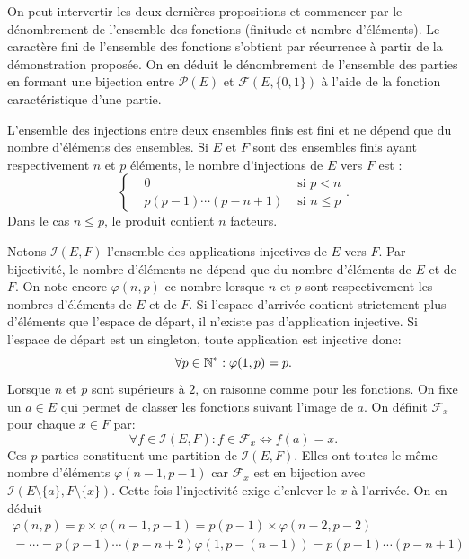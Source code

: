 \begin{rem}
 On peut intervertir les deux dernières propositions et commencer par le dénombrement de l'ensemble des fonctions (finitude et nombre d'éléments). Le caractère fini de l'ensemble des fonctions s'obtient par récurrence à partir de la démonstration proposée. On en déduit le dénombrement de l'ensemble des parties en formant une bijection entre $\mathcal P(E)$ et $\mathcal F(E,\{0,1\})$ à l'aide de la fonction caractéristique d'une partie. 
\end{rem}
\clearpage
{}
\begin{propn}
 L'ensemble des injections entre deux ensembles finis est fini et ne dépend que du nombre d'éléments des ensembles. Si $E$ et $F$ sont des ensembles finis ayant respectivement $n$ et $p$ éléments, le nombre d'injections de $E$ vers $F$ est :
\[
\left\lbrace
\begin{aligned}
 &0 &\text{ si } p<n \\
 & p(p-1)\cdots(p-n+1) &\text{ si } n\leq p 
\end{aligned}
\right. . 
\]
Dans le cas $n\leq p$, le produit contient $n$ facteurs.
\end{propn}
\begin{demo}
 Notons $\mathcal{I}(E,F)$ l'ensemble des applications injectives de $E$ vers $F$. Par bijectivité, le nombre d'éléments ne dépend que du nombre d'éléments de $E$ et de $F$. On note encore $\varphi(n,p)$ ce nombre lorsque $n$ et $p$ sont respectivement les nombres d'éléments de $E$ et de $F$.\newline
Si l'espace d'arrivée contient strictement plus d'éléments que l'espace de départ, il n'existe pas d'application injective. Si l'espace de départ est un singleton, toute application est injective donc:
\begin{displaymath}
 \forall p\in \mathbb{N}^* : \varphi(1,p) = p.
\end{displaymath}
 Lorsque $n$ et $p$ sont supérieurs à $2$, on raisonne comme pour les fonctions. On fixe un $a\in E$ qui permet de classer les fonctions suivant l'image de $a$. On définit $\mathcal F_x$ pour chaque $x\in F$ par:
\begin{displaymath}
 \forall f\in \mathcal I(E,F) : f\in \mathcal F_x \Leftrightarrow f(a)=x .
\end{displaymath}
Ces $p$ parties constituent une partition de $\mathcal I(E,F)$.\newline
Elles ont toutes le même nombre d'éléments $\varphi(n-1,p-1)$ car $\mathcal F_x$ est en bijection avec $\mathcal I(E\setminus\{a\},F\setminus\{x\})$. Cette fois l'injectivité exige d'enlever le $x$ à l'arrivée.\newline
On en déduit
\begin{multline*}
 \varphi(n,p)= p\times\varphi(n-1,p-1) = p(p-1)\times\varphi(n-2,p-2)\\
=\cdots = p(p-1)\cdots (p-n+2)\varphi(1,p-(n-1))= p(p-1)\cdots (p-n+1)
\end{multline*}
 
\end{demo}

